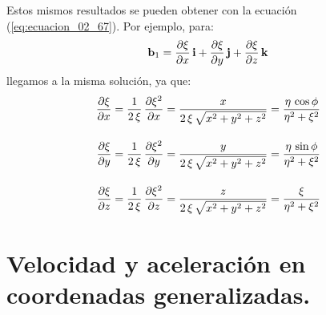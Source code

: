 Estos mismos resultados se pueden obtener con la ecuación (\ref{eq:ecuacion_02_67}). Por ejemplo, para:
\begin{align*}
    \vb{b}_{1} = \pdv{\xi}{x} \, \vb{i} + \pdv{\xi}{y} \, \vb{j} + \pdv{\xi}{z} \, \vb{k}
\end{align*} 
llegamos a la misma solución, ya que:
\begin{align*}
    \pdv{\xi}{x} &= \dfrac{1}{2 \, \xi} \, \pdv{\xi^{2}}{x} = \dfrac{x}{2 \, \xi \, \sqrt{x^{2} + y^{2} + z^{2}}} = \dfrac{\eta \, \cos \phi}{\eta^{2} + \xi^{2}} \\[1em]
    \pdv{\xi}{y} &= \dfrac{1}{2 \, \xi} \, \pdv{\xi^{2}}{y} = \dfrac{y}{2 \, \xi \, \sqrt{x^{2} + y^{2} + z^{2}}} = \dfrac{\eta \, \sin \phi}{\eta^{2} + \xi^{2}} \\[1em]
    \pdv{\xi}{z} &= \dfrac{1}{2 \, \xi} \, \pdv{\xi^{2}}{z} = \dfrac{z}{2 \, \xi \, \sqrt{x^{2} + y^{2} + z^{2}}} = \dfrac{\xi}{\eta^{2} + \xi^{2}}
\end{align*}

\section{Velocidad y aceleración en coordenadas generalizadas.}

